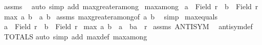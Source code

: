 \begin{isabellebody}
%
\isadelimproof
%
\endisadelimproof
%
\isatagproof
{}\isamarkupfalse%
\ assms\ \isamarkupfalse%
\ {\isacharparenleft}{\kern0pt}auto\ simp\ add{\isacharcolon}{\kern0pt}\ max{}{\isacharunderscore}{\kern0pt}greater{\isacharunderscore}{\kern0pt}among{\isacharparenright}{\kern0pt}%
\endisatagproof
{\isafoldproof}%
%
\isadelimproof
\isanewline
%
\endisadelimproof
\isanewline
{}\isamarkupfalse%
\ max{}{\isacharunderscore}{\kern0pt}among{\isacharcolon}{\kern0pt}\isanewline
{}\ {\isachardoublequoteopen}a\ {\isasymin}\ Field\ r{\isachardoublequoteclose}\ \ {\isachardoublequoteopen}b\ {\isasymin}\ Field\ r{\isachardoublequoteclose}\isanewline
{}\ {\isachardoublequoteopen}max{}\ a\ b\ {\isasymin}\ {\isacharbraceleft}{\kern0pt}a{\isacharcomma}{\kern0pt}\ b{\isacharbraceright}{\kern0pt}{\isachardoublequoteclose}\isanewline
%
\isadelimproof
%
\endisadelimproof
%
\isatagproof
{}\isamarkupfalse%
\ assms\ max{}{\isacharunderscore}{\kern0pt}greater{\isacharunderscore}{\kern0pt}among{\isacharbrackleft}{\kern0pt}of\ a\ b{\isacharbrackright}{\kern0pt}\ \isamarkupfalse%
\ simp%
\endisatagproof
{\isafoldproof}%
%
\isadelimproof
\isanewline
%
\endisadelimproof
\isanewline
{}\isamarkupfalse%
\ max{}{\isacharunderscore}{\kern0pt}equals{}{\isacharcolon}{\kern0pt}\isanewline
{}\ {\isachardoublequoteopen}a\ {\isasymin}\ Field\ r{\isachardoublequoteclose}\ \ {\isachardoublequoteopen}b\ {\isasymin}\ Field\ r{\isachardoublequoteclose}\isanewline
{}\ {\isachardoublequoteopen}{\isacharparenleft}{\kern0pt}max{}\ a\ b\ {\isacharequal}{\kern0pt}\ a{\isacharparenright}{\kern0pt}\ {\isacharequal}{\kern0pt}\ {\isacharparenleft}{\kern0pt}{\isacharparenleft}{\kern0pt}b{\isacharcomma}{\kern0pt}a{\isacharparenright}{\kern0pt}\ {\isasymin}\ r{\isacharparenright}{\kern0pt}{\isachardoublequoteclose}\isanewline
%
\isadelimproof
%
\endisadelimproof
%
\isatagproof
{}\isamarkupfalse%
\ assms\ ANTISYM\ \isamarkupfalse%
\ antisym{\isacharunderscore}{\kern0pt}def\ \isamarkupfalse%
\ TOTALS\isanewline
{}\isamarkupfalse%
{\isacharparenleft}{\kern0pt}auto\ simp\ add{\isacharcolon}{\kern0pt}\ max{}{\isacharunderscore}{\kern0pt}def\ max{}{\isacharunderscore}{\kern0pt}among{\isacharparenright}{\kern0pt}%
\endisatagproof
{\isafoldproof}%
%
\isadelimproof

\end{isabellebody}
